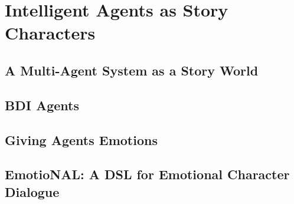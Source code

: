 \chapter{Intelligent Agents as Story Characters}

\section{A Multi-Agent System as a Story World}

\section{BDI Agents}

\section{Giving Agents Emotions}

\section{EmotioNAL: A DSL for Emotional Character Dialogue}